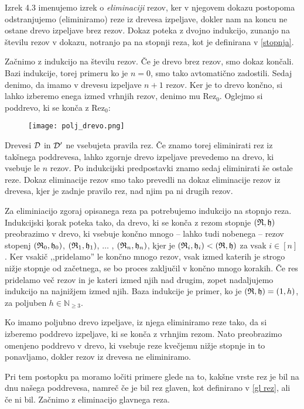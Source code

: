 Izrek 4.3 imenujemo izrek o \emph{eliminaciji} rezov, ker v njegovem dokazu postopoma odstranjujemo (eliminiramo) reze iz drevesa izpeljave, dokler nam na koncu ne ostane drevo izpeljave brez rezov. Dokaz poteka z dvojno indukcijo, zunanjo na številu rezov v dokazu, notranjo pa na stopnji reza, kot je definirana v \ref{stopnja}.

Začnimo z indukcijo na številu rezov. Če je drevo brez rezov, smo dokaz končali. Bazi indukcije, torej primeru ko je $n=0$, smo tako avtomatično zadostili. Sedaj denimo, da imamo v drevesu izpeljave $n+1$ rezov. Ker je to drevo končno, si lahko izberemo enega izmed vrhnjih rezov, denimo mu Rez$_0$. Oglejmo si poddrevo, ki se konča z Rez$_0$:
\begin{figure}[h]
    \centering \texttt{[image: polj\_drevo.png]}
\end{figure}

Drevesi $\mathcal{D}$ in $\mathcal{D}'$ ne vsebujeta pravila rez. Če znamo torej eliminirati rez iz takšnega poddrevesa, lahko zgornje drevo izpeljave prevedemo na drevo, ki vsebuje le $n$ rezov. Po indukcijski predpostavki znamo sedaj eliminirati še ostale reze. Dokaz eliminacije rezov smo tako prevedli na dokaz eliminacije rezov iz drevesa, kjer je zadnje pravilo rez, nad njim pa ni drugih rezov.

Za eliminiacijo zgoraj opisanega reza pa potrebujemo indukcijo na stopnjo reza. Indukcijski ķorak poteka tako, da drevo, ki se konča z rezom stopnje $(\mathfrak{R},\mathfrak{h})$ preobrazimo v drevo, ki vsebuje končno mnogo -- lahko tudi nobenega -- rezov stopenj $(\mathfrak{R}_0,\mathfrak{h}_0)$, $(\mathfrak{R}_1,\mathfrak{h}_1)$, $\ldots$ , $(\mathfrak{R}_n,\mathfrak{h}_n)$, kjer je $(\mathfrak{R}_i,\mathfrak{h}_i) < (\mathfrak{R},\mathfrak{h})$ za vsak $i\in[n]$. Ker vsakič ,,pridelamo'' le končno mnogo rezov, vsak izmed katerih je strogo nižje stopnje od začetnega, se bo proces zaključil v končno mnogo korakih. Če res pridelamo več rezov in je kateri izmed njih nad drugim, zopet nadaljujemo indukcijo na najnižjem izmed njih. Baza indukcije je primer, ko je $(\mathfrak{R},\mathfrak{h}) = (1,h)$, za poljuben $h\in\mathbb{N}_{\geq3}$.

\begin{summary}
    Ko imamo poljubno drevo izpeljave, iz njega eliminiramo reze tako, da si izberemo poddrevo izpeljave, ki se konča z vrhnjim rezom. Nato preobrazimo omenjeno poddrevo v drevo, ki vsebuje reze kvečjemu nižje stopnje in to ponavljamo, dokler rezov iz drevesa ne eliminiramo.
\end{summary}

Pri tem postopku pa moramo ločiti primere glede na to, kakšne vrste rez je bil na dnu našega poddrevesa, namreč če je bil rez glaven, kot definirano v \ref{gl rez}, ali če ni bil. Začnimo z eliminacijo glavnega reza.

